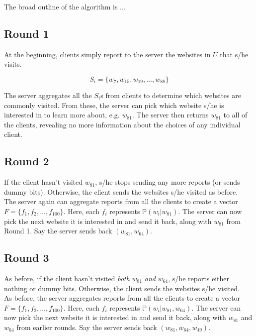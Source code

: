 \documentclass[12pt]{article}
\begin{document}
The broad outline of the algorithm is ...

	\subsection*{Round 1}

	At the beginning, clients simply report to the server the websites in $U$ that s/he visits.
	
	$$ S_i = \{w_7, w_{15}, w_{19}, \ldots, w_{88}\}$$
	
	The server aggregates all the $S_i$s from clients to determine which websites are commonly visited. From these, the server can pick which website s/he is interested in to learn more about, e.g. $w_{81}$. The server then returns $w_{81}$ to all of the clients, revealing no more information about the choices of any individual client.
	
	\subsection*{Round 2}
	
	If the client hasn't visited $w_{81}$, s/he stops sending any more reports (or sends dummy bits). Otherwise, the client sends the websites s/he visited as before. \\
	
	The server again can aggregate reports from all the clients to create a vector $F = \{f_1, f_2, \ldots, f_{100}\}$. Here, each $f_i$ represents $\mathbb{P}(w_i | w_{81})$. The server can now pick the next website it is interested in and send it back, along with $w_{81}$ from Round 1. Say the server sends back $(w_{81}, w_{64})$.
	
	\subsection*{Round 3}
	
	As before, if the client hasn't visited {\em both} $w_{81}$ {\em and} $w_{64}$, s/he reports either nothing or dummy bits. Otherwise, the client sends the websites s/he visited.\\
	
	As before, the server aggregates reports from all the clients to create a vector $F = \{f_1, f_2, \ldots, f_{100}\}$. Here, each $f_i$ represents $\mathbb{P}(w_i | w_{81}, w_{64})$. The server can now pick the next website it is interested in and send it back, along with $w_{81}$ and $w_{64}$ from earlier rounds. Say the server sends back $(w_{81}, w_{64}, w_{49})$.
	
\end{document}
